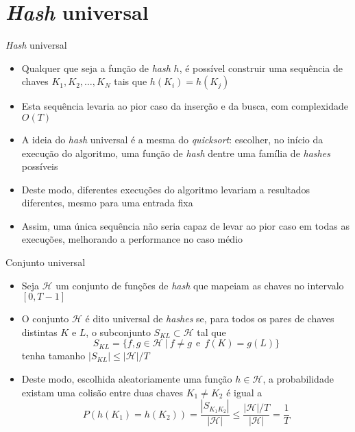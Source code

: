 \section{{\it Hash} universal}

\begin{frame}[fragile]{{\it Hash} universal}

    \begin{itemize}
        \item Qualquer que seja a função de  \textit{hash} $h$, é possível construir uma
            sequência de chaves $K_1, K_2, \ldots, K_N$ tais que $h(K_i) = h(K_j)$

        \item Esta sequência levaria ao pior caso da inserção e da busca, com complexidade
            $O(T)$

        \item A ideia do \textit{hash} universal é a mesma do \textit{quicksort}: escolher,
            no início da execução do algoritmo, uma função de \textit{hash} dentre uma 
            família de \textit{hashes} possíveis

        \item Deste modo, diferentes execuções do algoritmo levariam a resultados diferentes,
            mesmo para uma entrada fixa

        \item Assim, uma única sequência não seria capaz de levar ao pior caso em todas as
            execuções, melhorando a performance no caso médio
             
    \end{itemize}

\end{frame}

\begin{frame}[fragile]{Conjunto universal}

    \begin{itemize}
        \item Seja $\mathcal{H}$ um conjunto de funções de \textit{hash} que mapeiam as chaves
            no intervalo $[0, T -1]$

        \item O conjunto $\mathcal{H}$ é dito universal de \textit{hashes} se, para todos os pares 
            de chaves distintas $K$ e $L$, o subconjunto $S_{KL}\subset \mathcal{H}$ tal que
            \[
                S_{KL} = \lbrace f, g\in\mathcal{H}\ |\ f\neq g \ \ \mbox{e}\ \ f(K) = g(L)\rbrace
            \]
            tenha tamanho $|S_{KL}| \leq |\mathcal{H}|/T$

        \item Deste modo, escolhida aleatoriamente uma função $h\in\mathcal{H}$, a probabilidade 
            existam uma colisão entre duas chaves $K_1\neq K_2$ é igual a
            \[
                P(h(K_1) = h(K_2)) = \frac{|S_{K_1K_2}|}{|\mathcal{H}|} \leq \frac{|\mathcal{H}|/T}{|\mathcal{H}|} = \frac{1}{T}
            \]

    \end{itemize}

\end{frame}

